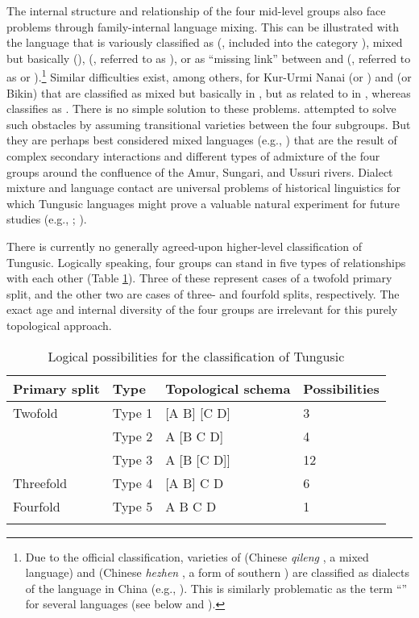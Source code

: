 \documentclass[output=paper,colorlinks,citecolor=brown]{langscibook}
\begin{document}
The internal structure and relationship of the four mid-level groups also face problems through family-internal language mixing. This can be illustrated with the language  that is variously classified as  (\citealt{Oskolskayaetal2022}, included into the category ), mixed but basically  (),  (\citealt{Kazama2003}, referred to as ), or as “missing link” between  and  (\citealt{Kazama1998}, referred to as  or ).\footnote{Due to the official classification, varieties of  (Chinese \textit{qileng} , a mixed language) and  (Chinese \textit{hezhen} , a form of southern ) are classified as dialects of the   language in China (e.g., \citealt{AnJun1986}). This is similarly problematic as the term “” for several  languages (see below and ).} Similar difficulties exist, among others, for Kur-Urmi Nanai (or ) and  (or Bikin)  that are classified as mixed but basically  in , but as related to  in \citet{Oskolskayaetal2022}, whereas \citet{Kazama2003} classifies  as . There is no simple solution to these problems. \citet[4f.]{Doerfer1978} attempted to solve such obstacles by assuming transitional varieties between the four subgroups. But they are perhaps best considered mixed languages (e.g., \citealt[6]{Janhunen2012a}) that are the result of complex secondary interactions and different types of admixture of the four groups around the confluence of the Amur, Sungari, and Ussuri rivers. Dialect mixture and language contact are universal problems of historical linguistics for which Tungusic languages might prove a valuable natural experiment for future studies (e.g., \citealt{Eppsetal2013}; \citealt{McMahon2013}).

There is currently no generally agreed-upon higher-level classification of Tungusic. Logically speaking, four groups can stand in five types of relationships with each other (Table \ref{Introtable:2}). Three of these represent cases of a twofold primary split, and the other two are cases of three- and fourfold splits, respectively. The exact age and internal diversity of the four groups are irrelevant for this purely topological approach.

\begin{table}
\begin{tabular}{ l l l l }
  \lsptoprule
Primary split	& Type	& Topological schema	& Possibilities\\
  \midrule
Twofold	& Type 1	& [A B] [C D]	& 3\\
	& Type 2	& A [B C D]	& 4\\
	& Type 3	& A [B [C D]]	& 12\\
Threefold	& Type 4	& [A B] C D	& 6\\
Fourfold	& Type 5	& A B C D	& 1\\
  \lspbottomrule
\end{tabular}
\caption{Logical possibilities for the classification of Tungusic}
\label{Introtable:2}
\end{table}
\end{document}
